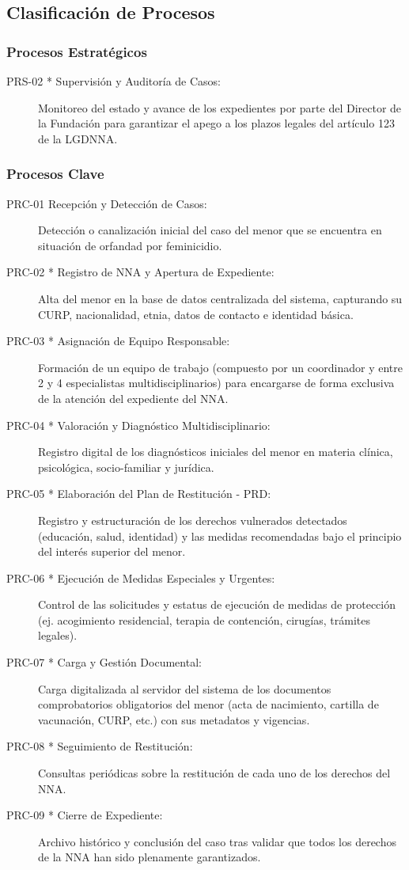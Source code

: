 \subsection{Clasificación de Procesos}

\subsubsection{Procesos Estratégicos}
\begin{description}
	\item[PRS-02 * Supervisión y Auditoría de Casos:] Monitoreo del estado y avance de los expedientes por parte del Director de la Fundación para garantizar el apego a los plazos legales del artículo 123 de la LGDNNA.
\end{description}

\subsubsection{Procesos Clave}
\begin{description}
	\item[PRC-01 Recepción y Detección de Casos:] Detección o canalización inicial del caso del menor que se encuentra en situación de orfandad por feminicidio.
	\item[PRC-02 * Registro de NNA y Apertura de Expediente:] Alta del menor en la base de datos centralizada del sistema, capturando su CURP, nacionalidad, etnia, datos de contacto e identidad básica.
	\item[PRC-03 * Asignación de Equipo Responsable:] Formación de un equipo de trabajo (compuesto por un coordinador y entre 2 y 4 especialistas multidisciplinarios) para encargarse de forma exclusiva de la atención del expediente del NNA.
	\item[PRC-04 * Valoración y Diagnóstico Multidisciplinario:] Registro digital de los diagnósticos iniciales del menor en materia clínica, psicológica, socio-familiar y jurídica.
	\item[PRC-05 * Elaboración del Plan de Restitución - PRD:] Registro y estructuración de los derechos vulnerados detectados (educación, salud, identidad) y las medidas recomendadas bajo el principio del interés superior del menor.
	\item[PRC-06 * Ejecución de Medidas Especiales y Urgentes:] Control de las solicitudes y estatus de ejecución de medidas de protección (ej. acogimiento residencial, terapia de contención, cirugías, trámites legales).
	\item[PRC-07 * Carga y Gestión Documental:] Carga digitalizada al servidor del sistema de los documentos comprobatorios obligatorios del menor (acta de nacimiento, cartilla de vacunación, CURP, etc.) con sus metadatos y vigencias.
	\item[PRC-08 * Seguimiento de Restitución:] Consultas periódicas sobre la restitución de cada uno de los derechos del NNA.
	\item[PRC-09 * Cierre de Expediente:] Archivo histórico y conclusión del caso tras validar que todos los derechos de la NNA han sido plenamente garantizados.
\end{description}

